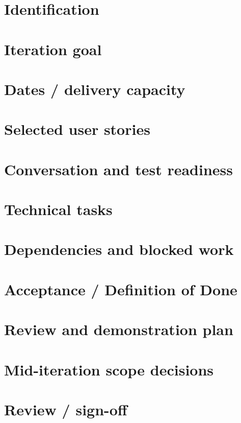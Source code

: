 \documentclass[11pt,letterpaper]{article}
\begin{document}
\section{Identification}
\section{Iteration goal}
\section{Dates / delivery capacity}
\section{Selected user stories}
\section{Conversation and test readiness}
\section{Technical tasks}
\clearpage
\section{Dependencies and blocked work}
\section{Acceptance / Definition of Done}
\section{Review and demonstration plan}
\section{Mid-iteration scope decisions}
\clearpage
\section{Review / sign-off}
\end{document}
